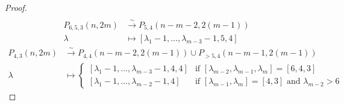 \documentclass[12pt,a4paper]{article}
\begin{document}
\begin{proof}
\begin{align*}
  \end{align*}
  \begin{align*}
    P_{6,5,3}(n,2m)&\xrightarrow{\sim} P_{5,4}(n-m-2,2(m-1)) \\
    \lambda&\mapsto [\lambda_1-1, \dots, \lambda_{m-3}-1,5,4]
  \end{align*}
  \begin{align*}
    P_{4, 3}(n,2m)&\xrightarrow{\sim} P_{4, 4}(n-m-2,2(m-1))\cup P_{>5, 4}(n-m-1,2(m-1)) \\
    \lambda&\mapsto
             \begin{cases}
               [\lambda_1-1, \dots, \lambda_{m-3}-1, 4, 4] & \text{if } [\lambda_{m-2},\lambda_{m-1}, \lambda_m]=[6, 4, 3] \\
               [\lambda_1-1, \dots, \lambda_{m-2}-1, 4] & \text{if } [\lambda_{m-1},\lambda_m]=[4, 3]\text{ and } \lambda_{m-2}>6
             \end{cases}
  \end{align*}
\end{proof}
\end{document}
